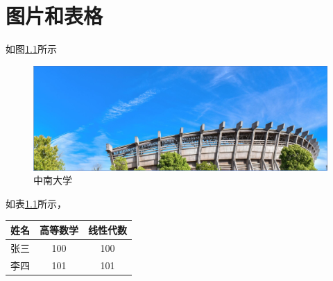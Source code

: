 \chapter{图片和表格}
如图\ref{fig:csu}所示
\begin{figure}[H]
	\centering
	\includegraphics[width=0.8\linewidth]{figures/csu}
	\caption{中南大学}
	\label{fig:csu}%
\end{figure}

如表\ref{tab:scores}所示，
\begin{table}[H]
\centering
{}\label{tab:scores}
\begin{tabular}{ccc}
	\toprule 
	姓名 & 高等数学 & 线性代数 \\
	\midrule
	张三 & 100 & 100 \\
	李四 & 101 & 101 \\
	\bottomrule
\end{tabular}
\end{table}
